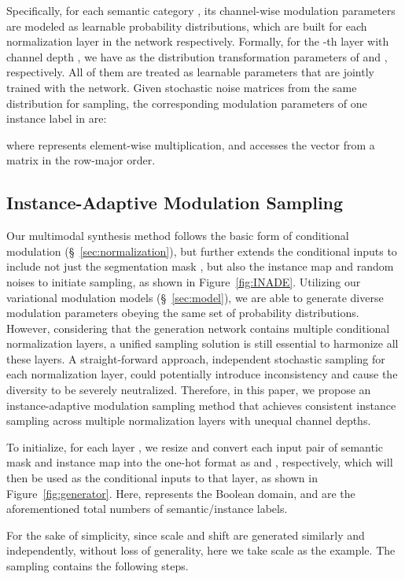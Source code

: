 \documentclass[final]{cvpr}
\begin{document}
Specifically, for each semantic category , its channel-wise modulation parameters are modeled as learnable probability distributions, which are built for each normalization layer in the network respectively. Formally, for the -th layer with channel depth , we have  as the distribution transformation parameters of  and , respectively. All of them are treated as learnable parameters that are jointly trained with the network. Given stochastic noise matrices  from the same distribution for sampling, the corresponding modulation parameters of one instance label  in  are:

where  represents element-wise multiplication, and  accesses the vector from a matrix in the row-major order. 

\subsection{Instance-Adaptive Modulation Sampling}
\label{sec:sampling}
Our multimodal synthesis method follows the basic form of conditional modulation (\S~\ref{sec:normalization}), but further extends the conditional inputs to include not just the segmentation mask , but also the instance map  and random noises to initiate sampling, as shown in Figure~\ref{fig:INADE}. Utilizing our variational modulation models (\S~\ref{sec:model}), we are able to generate diverse modulation parameters obeying the same set of probability distributions. However, considering that the generation network contains multiple conditional normalization layers, a unified sampling solution is still essential to harmonize all these layers. A straight-forward approach, independent stochastic sampling for each normalization layer, could potentially introduce inconsistency and cause the diversity to be severely neutralized. Therefore, in this paper, we propose an instance-adaptive modulation sampling method that achieves consistent instance sampling across multiple normalization layers with unequal channel depths.

To initialize, for each layer , we resize and convert each input pair of semantic mask  and instance map  into the one-hot format as  and , respectively, which will then be used as the conditional inputs to that layer, as shown in Figure~\ref{fig:generator}. Here,  represents the Boolean domain, and  are the aforementioned total numbers of semantic/instance labels.

For the sake of simplicity, since scale  and shift  are generated similarly and independently, without loss of generality, here we take scale  as the example. The sampling contains the following steps.
\end{document}
